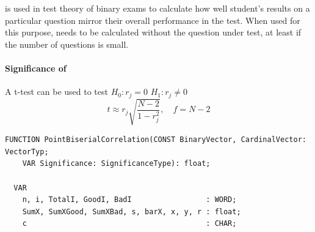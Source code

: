 \begin{refsection}
 is used in test theory of binary exams to calculate how well student's results on a particular question mirror their overall performance in the test. When used for this purpose,  needs to be calculated without the question under test, at least if the number of questions is small.

\paragraph{Significance of }

A t-test can be used to test \(H_0: r_j = 0 \)  \(H_1: r_j \neq 0 \)
\begin{equation}
  t \approx r_j \sqrt{\frac{N-2}{1-r_j^2}}, \quad f = N - 2
\end{equation}

\begin{lstlisting}[caption=PointBiserial correlation and its significance]
  FUNCTION PointBiserialCorrelation(CONST BinaryVector, CardinalVector: VectorTyp;
    VAR Significance: SignificanceType): float;

  VAR
    n, i, TotalI, GoodI, BadI                 : WORD;
    SumX, SumXGood, SumXBad, s, barX, x, y, r : float;
    c                                         : CHAR;


\end{lstlisting}
\end{refsection}
